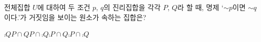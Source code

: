 전체집합 $U$에 대하여 두 조건 $p$, $q$의 진리집합을 각각 $P$, $Q$라 할 때, 명제 `$\sim p$이면 $\sim q$이다.'가 거짓임을 보이는 원소가 속하는 집합은?
\begin{choices32}{$\comp{Q}$}{$P\cap Q$}{$P\cap\comp{Q}$}{$\comp{P}\cap Q$}{$\comp{P}\cap\comp{Q}$}\end{choices32}
